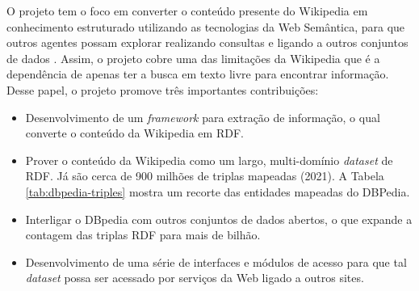 O projeto tem o foco em converter o conteúdo presente do Wikipedia em conhecimento estruturado utilizando as tecnologias da Web Semântica, para que outros agentes possam explorar realizando consultas e ligando a outros conjuntos de dados \citep{Auer:2007:DNW:1785162.1785216}. Assim, o projeto cobre uma das limitações da Wikipedia que é a dependência de apenas ter a busca em texto livre para encontrar informação. Desse papel, o projeto promove três importantes contribuições:

\begin{itemize}
	\item{Desenvolvimento de um \textit{framework} para extração de informação, o qual converte o conteúdo da Wikipedia em RDF.}

	\item{Prover o conteúdo da Wikipedia como um largo, multi-domínio \textit{dataset} de RDF. Já são cerca de 900 milhões de triplas mapeadas (2021). A Tabela \ref{tab:dbpedia-triples} mostra um recorte das entidades mapeadas do DBPedia.}

	\item{Interligar o DBpedia com outros conjuntos de dados abertos, o que expande a contagem das triplas RDF para mais de bilhão.}

	\item{Desenvolvimento de uma série de interfaces e módulos de acesso para que tal \textit{dataset} possa ser acessado por serviços da Web ligado a outros sites.}
\end{itemize}

